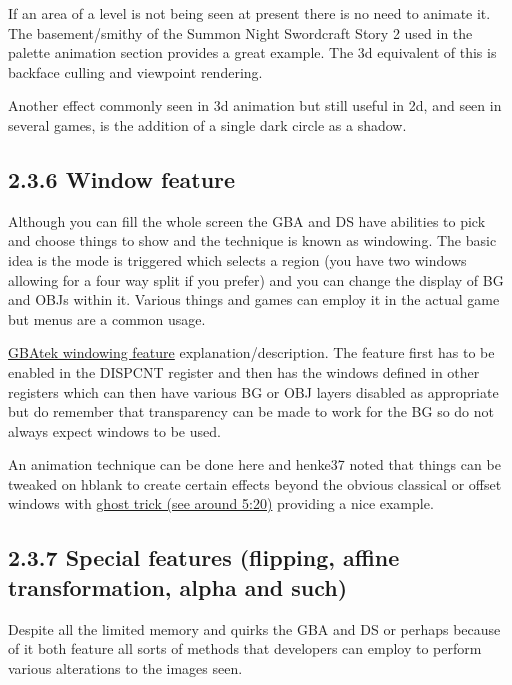 \documentclass[
]{book}
\begin{document}
If an area of a level is not being seen at present there is no need to animate it. The basement/smithy of the Summon Night Swordcraft Story 2 used in the palette animation section provides a great example. The 3d equivalent of this is backface culling and viewpoint rendering.

Another effect commonly seen in 3d animation but still useful in 2d, and seen in several games, is the addition of a single dark circle as a shadow.

\hypertarget{window-feature}{%
\subsection{2.3.6 Window feature}\label{window-feature}}

Although you can fill the whole screen the GBA and DS have abilities to pick and choose things to show and the technique is known as windowing. The basic idea is the mode is triggered which selects a region (you have two windows allowing for a four way split if you prefer) and you can change the display of BG and OBJs within it. Various things and games can employ it in the actual game but menus are a common usage.

\href{http://problemkaputt.de/gbatek.htm\#lcdiowindowfeature}{GBAtek windowing feature} explanation/description. The feature first has to be enabled in the DISPCNT register and then has the windows defined in other registers which can then have various BG or OBJ layers disabled as appropriate but do remember that transparency can be made to work for the BG so do not always expect windows to be used.

An animation technique can be done here and henke37 noted that things can be tweaked on hblank to create certain effects beyond the obvious classical or offset windows with \href{http://www.youtube.com/watch?v=1t8wWnI_I1I\&feature=related}{ghost trick (see around 5:20)} providing a nice example.

\hypertarget{special-features-flipping-affine-transformation-alpha-and-such}{%
\subsection{2.3.7 Special features (flipping, affine transformation, alpha and such)}\label{special-features-flipping-affine-transformation-alpha-and-such}}

Despite all the limited memory and quirks the GBA and DS or perhaps because of it both feature all sorts of methods that developers can employ to perform various alterations to the images seen.
\end{document}
